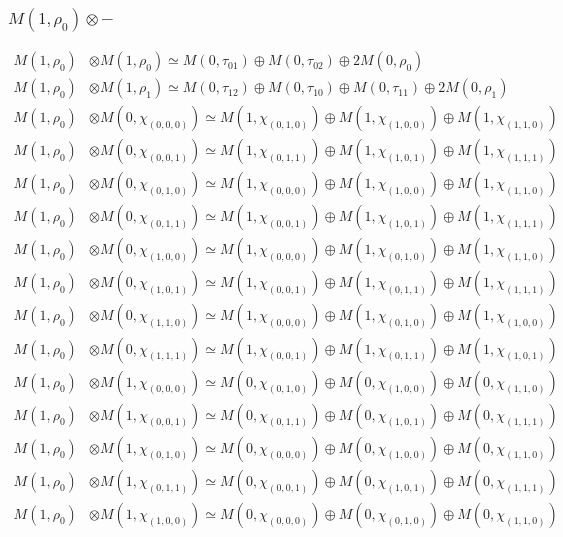 \subsubsection{$ M(1,\rho_{0})\otimes -$}
\begin{align*}
M(1,\rho_{0}) &\otimes M(1,\rho_{0}) \simeq M(0,\tau_{01}) \oplus M(0,\tau_{02}) \oplus 2 M(0,\rho_{0}) \\
M(1,\rho_{0}) &\otimes M(1,\rho_{1}) \simeq M(0,\tau_{12}) \oplus M(0,\tau_{10}) \oplus M(0,\tau_{11}) \oplus 2 M(0,\rho_{1}) \\
M(1,\rho_{0}) &\otimes M(0,\chi_{(0,0,0)}) \simeq M(1,\chi_{(0,1,0)}) \oplus M(1,\chi_{(1,0,0)}) \oplus M(1,\chi_{(1,1,0)}) \\
M(1,\rho_{0}) &\otimes M(0,\chi_{(0,0,1)}) \simeq M(1,\chi_{(0,1,1)}) \oplus M(1,\chi_{(1,0,1)}) \oplus M(1,\chi_{(1,1,1)}) \\
M(1,\rho_{0}) &\otimes M(0,\chi_{(0,1,0)}) \simeq M(1,\chi_{(0,0,0)}) \oplus M(1,\chi_{(1,0,0)}) \oplus M(1,\chi_{(1,1,0)}) \\
M(1,\rho_{0}) &\otimes M(0,\chi_{(0,1,1)}) \simeq M(1,\chi_{(0,0,1)}) \oplus M(1,\chi_{(1,0,1)}) \oplus M(1,\chi_{(1,1,1)}) \\
M(1,\rho_{0}) &\otimes M(0,\chi_{(1,0,0)}) \simeq M(1,\chi_{(0,0,0)}) \oplus M(1,\chi_{(0,1,0)}) \oplus M(1,\chi_{(1,1,0)}) \\
M(1,\rho_{0}) &\otimes M(0,\chi_{(1,0,1)}) \simeq M(1,\chi_{(0,0,1)}) \oplus M(1,\chi_{(0,1,1)}) \oplus M(1,\chi_{(1,1,1)}) \\
M(1,\rho_{0}) &\otimes M(0,\chi_{(1,1,0)}) \simeq M(1,\chi_{(0,0,0)}) \oplus M(1,\chi_{(0,1,0)}) \oplus M(1,\chi_{(1,0,0)}) \\
M(1,\rho_{0}) &\otimes M(0,\chi_{(1,1,1)}) \simeq M(1,\chi_{(0,0,1)}) \oplus M(1,\chi_{(0,1,1)}) \oplus M(1,\chi_{(1,0,1)}) \\
M(1,\rho_{0}) &\otimes M(1,\chi_{(0,0,0)}) \simeq M(0,\chi_{(0,1,0)}) \oplus M(0,\chi_{(1,0,0)}) \oplus M(0,\chi_{(1,1,0)}) \\
M(1,\rho_{0}) &\otimes M(1,\chi_{(0,0,1)}) \simeq M(0,\chi_{(0,1,1)}) \oplus M(0,\chi_{(1,0,1)}) \oplus M(0,\chi_{(1,1,1)}) \\
M(1,\rho_{0}) &\otimes M(1,\chi_{(0,1,0)}) \simeq M(0,\chi_{(0,0,0)}) \oplus M(0,\chi_{(1,0,0)}) \oplus M(0,\chi_{(1,1,0)}) \\
M(1,\rho_{0}) &\otimes M(1,\chi_{(0,1,1)}) \simeq M(0,\chi_{(0,0,1)}) \oplus M(0,\chi_{(1,0,1)}) \oplus M(0,\chi_{(1,1,1)}) \\
M(1,\rho_{0}) &\otimes M(1,\chi_{(1,0,0)}) \simeq M(0,\chi_{(0,0,0)}) \oplus M(0,\chi_{(0,1,0)}) \oplus M(0,\chi_{(1,1,0)}) \\

\end{align*}
